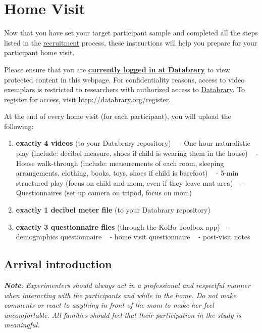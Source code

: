 \documentclass[
]{book}
\providecommand{\tightlist}{%
  \setlength{\itemsep}{0pt}\setlength{\parskip}{0pt}}
\begin{document}
\hypertarget{home-visit}{%
\chapter{Home Visit}\label{home-visit}}

Now that you have set your target participant sample and completed all the steps listed in the \href{collection_recruitment.html}{recruitment} process, these instructions will help you prepare for your participant home visit.

Please ensure that you are \href{https://nyu.databrary.org/user/login}{\textbf{currently logged in at Databrary}} to view protected content in this webpage. For confidentiality reasons, access to video exemplars is restricted to researchers with authorized access to \href{http://databrary.org}{Databrary}. To register for access, visit \url{http://databrary.org/register}.

At the end of every home visit (for each participant), you will upload the following:

\begin{enumerate}
\def\labelenumi{\arabic{enumi}.}
\tightlist
\item
  \textbf{exactly 4 videos} (to your Databrary repository)
  ~ - One-hour naturalistic play (include: decibel measure, shoes if child is wearing them in the house)
  ~ - House walk-through (include: measurements of each room, sleeping arrangements, clothing, books, toys, shoes if child is barefoot)
  ~ - 5-min structured play (focus on child and mom, even if they leave mat area)
  ~ - Questionnaires (set up camera on tripod, focus on mom)
\item
  \textbf{exactly 1 decibel meter file} (to your Databrary repository)
\item
  \textbf{exactly 3 questionnaire files} (through the KoBo Toolbox app)
  ~ - demographics questionnaire
  ~ - home visit questionnaire
  ~ - post-visit notes
\end{enumerate}

\hypertarget{arrival-introduction}{%
\section{Arrival introduction}\label{arrival-introduction}}

\emph{\textbf{Note}: Experimenters should always act in a professional and respectful manner when interacting with the participants and while in the home. Do not make comments or react to anything in front of the mom to make her feel uncomfortable. All families should feel that their participation in the study is meaningful.}
\end{document}

